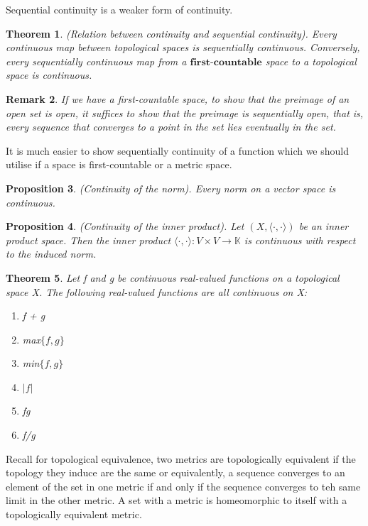 \documentclass[twoside]{article}
\newcounter{lecnum}
\newtheorem{theorem}{Theorem}[lecnum]
\newtheorem{proposition}[theorem]{Proposition}
\newtheorem{remark}[theorem]{Remark}
\begin{document}
Sequential continuity is a weaker form of continuity.

\begin{theorem}(Relation between continuity and sequential continuity). Every continuous map between topological spaces is sequentially continuous. Conversely, every sequentially continuous map from a $\textbf{first-countable}$ space to a topological space is continuous.
\end{theorem}

\begin{remark}If we have a first-countable space, to show that the preimage of an open set is open, it suffices to show that the preimage is sequentially open, that is, every sequence that converges to a point in the set lies eventually in the set.
\end{remark}

It is much easier to show sequentially continuity of a function which we should utilise if a space is first-countable or a metric space.

\begin{proposition}(Continuity of the norm). Every norm on a vector space is continuous.
\end{proposition}

\begin{proposition}(Continuity of the inner product). Let $(X, \langle \cdot,\cdot \rangle )$ be an inner product space. Then the inner product $\langle \cdot,\cdot \rangle : V \times V \rightarrow \mathbb{K}$ is continuous with respect to the induced norm.
\end{proposition}

\begin{theorem}Let f and g be continuous real-valued functions on a topological space X. The following real-valued functions are all continuous on X:
\begin{enumerate}
\item f + g
\item max$\{f,g\}$
\item min$\{f,g\}$
\item $|f|$
\item fg
\item f/g
\end{enumerate}
\end{theorem}

Recall for topological equivalence, two metrics are topologically equivalent if the topology they induce are the same or equivalently, a sequence converges to an element of the set in one metric if and only if the sequence converges to teh same limit in the other metric. A set with a metric is homeomorphic to itself with a topologically equivalent metric. 
\end{document}
